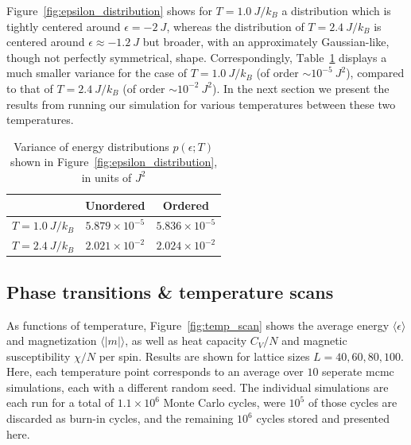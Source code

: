 \documentclass[english,notitlepage,reprint]{revtex4-2}  %
\begin{document}
Figure~\ref{fig:epsilon_distribution} shows for \(T=1.0 \ \si{J/k_B}\) a distribution which is tightly centered around \(\epsilon=-2\ \si{J}\), whereas the distribution of \(T=2.4 \ \si{J/k_B}\) is centered around \(\epsilon\approx -1.2\ \si{J}\) but broader, with an approximately Gaussian-like, though not perfectly symmetrical, shape.
Correspondingly, \({\text{Table}}\)~\ref{table:epsilon_distribution} displays a much smaller variance for the case of \(T=1.0 \ \si{J/k_B}\) (of order \(\sim 10^{-5} \ \si{J^2}\)), compared to that of \(T=2.4 \ \si{J/k_B}\) (of order \(\sim 10^{-2} \ \si{J^2}\)).
In the next section we present the results from running our simulation for various temperatures between these two temperatures.
\begin{table}[h!]
    \centering
    \setlength{\tabcolsep}{6pt}
    \renewcommand{\arraystretch}{1.4}
    \begin{tabular}{c|cc}
        & Unordered & Ordered \\
        \hline
        $T = 1.0\ \si{J/k_B}$ &  $5.879\times10^{-5}$ & $5.836\times10^{-5}$ \\
        $T = 2.4\ \si{J/k_B}$ &  $2.021\times10^{-2}$ & $2.024\times10^{-2}$ \\
    \end{tabular}
    \caption{Variance of energy distributions $p(\epsilon;T)$ shown in Figure~\ref{fig:epsilon_distribution}, in units of $\si{J^2}$ }
    \label{table:epsilon_distribution}
\end{table}

\subsection{Phase transitions \& temperature scans} \label{sec:Phase_trans_temp_ScAns}
As functions of temperature, Figure~\ref{fig:temp_scan} shows the average energy \(\langle \epsilon\rangle\) and  magnetization \(\langle |m|\rangle\), as well as heat capacity \(C_V/N\) and magnetic susceptibility \(\chi/N\) per spin.
Results are shown for lattice sizes \(L = 40, 60, 80, 100\).
Here, each temperature point corresponds to an average over $10$ seperate \gls{mcmc} simulations, each with a different random seed.
The individual simulations are each run for a total of \(1.1\times 10^6\) Monte Carlo cycles, were \(10^5\) of those cycles are discarded as burn-in cycles, and the remaining \(10^6\) cycles stored and presented here.
\end{document}
